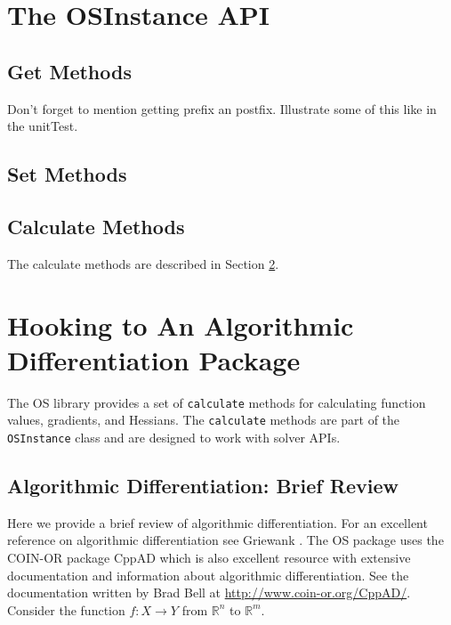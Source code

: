 \documentclass[11pt]{article}
\renewcommand{\_}{{\char"5F}}
\renewcommand{\{}{{\char"7B}}
\renewcommand{\}}{{\char"7D}}
\renewcommand{\^}{{\char"0D}}
\renewcommand{\'}{{\char"0D}}
\begin{document}
\section{The  OSInstance API}\label{section:osinstance}

\subsection{Get Methods}

Don't forget to mention getting prefix an postfix. Illustrate some of this like in the unitTest.

\subsection{Set Methods}

\subsection{Calculate Methods}

The calculate methods are described in Section \ref{section:ad}.

\section{Hooking to An Algorithmic Differentiation Package}\label{section:ad}

The OS library provides a set of {\tt calculate} methods for calculating  function values, gradients, and Hessians.     The {\tt calculate} methods are part of the {\tt OSInstance} class and are designed to work with solver APIs.



\subsection{Algorithmic Differentiation:  Brief Review}\label{section:adtheory}

Here we provide a brief review of algorithmic differentiation.  For an excellent reference on algorithmic differentiation see Griewank \cite{griewank2000}.  The OS package uses the COIN-OR package CppAD which  is also excellent resource with extensive  documentation and information about algorithmic differentiation. See the documentation written by  Brad Bell at  \url{http://www.coin-or.org/CppAD/}.   Consider the function $f:X \rightarrow Y$ from $ \mathbb{R}^{n}$ to $ \mathbb{R}^{m}.$ 
\end{document}
